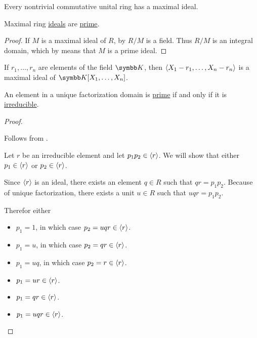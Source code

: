 \begin{theorem}\label{thm:krulls_theorem}\cite{Hodges1979}
  Every nontrivial commutative unital ring has a maximal ideal.
\end{theorem}

\begin{proposition}\label{thm:maximal_ideals_are_prime}
  Maximal ring \hyperref[def:maximal_ring_ideal]{ideals} are \hyperref[def:prime_ring_ideal]{prime}.
\end{proposition}
\begin{proof}
  If \( M \) is a maximal ideal of \( R \), by  \( R / M \) is a field. Thus \( R / M \) is an integral domain, which by  means that \( M \) is a prime ideal.
\end{proof}

\begin{proposition}\label{thm:field_maximal_ideal_representation}\cite[exercise 8.1]{Коцев2016}
  If \( r_1, \ldots, r_n \) are elements of the field \( \BK \), then \( \left\langle X_1 - r_1, \ldots, X_n - r_n \right\rangle \) is a maximal ideal of \( \BK[X_1, \ldots, X_n] \).
\end{proposition}

\begin{proposition}\label{thm:ufd_prime_iff_irreducible}
  An element in a unique factorization domain is \hyperref[def:prime_ring_ideal]{prime} if and only if it is \hyperref[def:irreducible_ring_element]{irreducible}.
\end{proposition}
\begin{proof}\mbox{}
  \begin{description}
    \Implies Follows from .

    \ImpliedBy Let \( r \) be an irreducible element and let \( p_1 p_2 \in \left\langle r \right\rangle \). We will show that either  \( p_1 \in \left\langle r \right\rangle \) or \( p_2 \in \left\langle r \right\rangle \).

    Since \( \left\langle r \right\rangle \) is an ideal, there exists an element \( q \in R \) such that \( qr = p_1 p_2 \). Because of unique factorization, there exists a unit \( u \in R \) such that \( uqr = p_1 p_2  \).

    Therefor either
    \begin{itemize}
      \item \( p_1 = 1 \), in which case \( p_2 = uqr \in \left\langle r \right\rangle \).
      \item \( p_1 = u \), in which case \( p_2 = qr \in \left\langle r \right\rangle \).
      \item \( p_1 = uq \), in which case \( p_2 = r \in \left\langle r \right\rangle \).
      \item \( p_1 = ur \in \left\langle r \right\rangle \).
      \item \( p_1 = qr \in \left\langle r \right\rangle \).
      \item \( p_1 = uqr \in \left\langle r \right\rangle \).
    \end{itemize}
  \end{description}
\end{proof}

